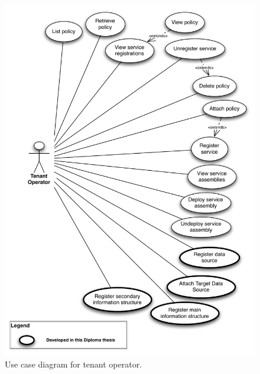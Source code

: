 \begin{figure}[htb]
	\centering
		\includegraphics[clip, scale=0.59]{./gfx/usecaseDataSource.pdf}
	\caption[Use Case Diagram for Tenant Operator]{Use case diagram for tenant operator.}
	\label{fig:usecases}
\end{figure}

